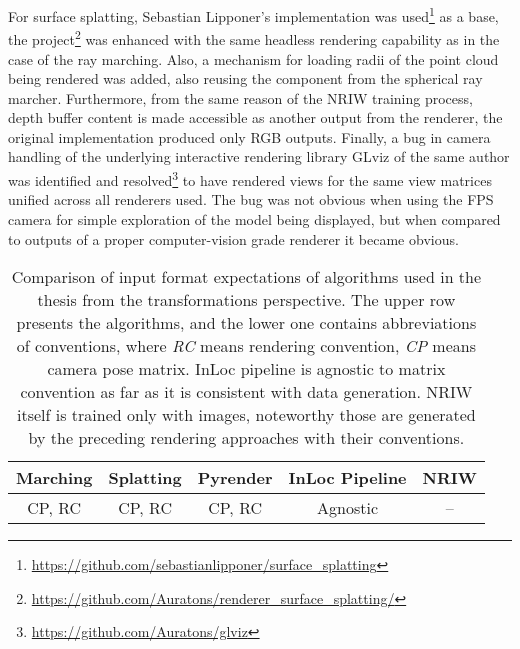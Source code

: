 For surface splatting, Sebastian Lipponer's implementation was
used\footnote{\url{https://github.com/sebastianlipponer/surface_splatting}} as a base, the
project\footnote{\url{https://github.com/Auratons/renderer_surface_splatting/}} was
enhanced with the same headless rendering capability as in the case of the ray marching.
Also, a mechanism for loading radii of the point cloud being rendered was added, also
reusing the component from the spherical ray marcher. Furthermore, from the same reason of
the NRIW training process, depth buffer content is made accessible as another output from
the renderer, the original implementation produced only RGB outputs.  Finally, a bug in
camera handling of the underlying interactive rendering library GLviz of the same author
was identified and resolved\footnote{\url{https://github.com/Auratons/glviz}} to have
rendered views for the same view matrices unified across all renderers used. The bug was
not obvious when using the FPS camera for simple exploration of the model being displayed,
but when compared to outputs of a proper computer-vision grade renderer it became obvious.


\begin{table}
\caption{Comparison of input format expectations of algorithms used in the
thesis from the transformations perspective. The upper row presents the algorithms, and
the lower one contains abbreviations of conventions, where \emph{RC} means rendering
convention, \emph{CP} means camera pose matrix. InLoc pipeline is agnostic to matrix
convention as far as it is consistent with data generation. NRIW itself is trained only
with images, noteworthy those are generated by the preceding rendering approaches with
their conventions.}
\centering
    \begin{tabular}{c c c c c}
    \toprule
    Marching & Splatting & Pyrender & InLoc Pipeline & NRIW\\
    \midrule
    CP, RC & CP, RC & CP, RC & Agnostic & -- \\
    \bottomrule
    \end{tabular}
\label{tab:agorithm_conventions}
\end{table}
